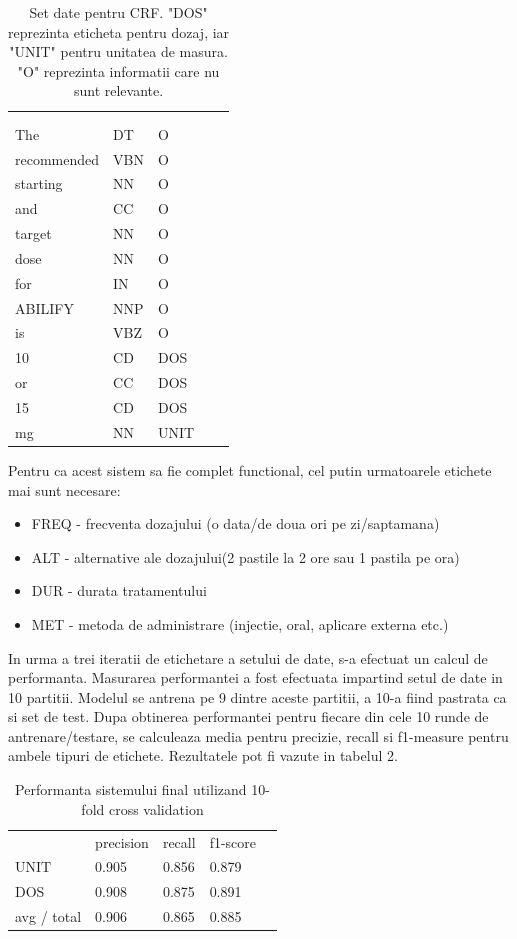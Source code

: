 \documentclass[a4paper,12pt]{article}
\begin{document}
\begin{table}[h]
\centering

\begin{tabular}{lllll}
            &     &     &  &  \\
            &     &     &  &  \\
The         & DT  & O   &  &  \\
recommended & VBN & O   &  &  \\
starting    & NN  & O   &  &  \\
and         & CC  & O   &  &  \\
target      & NN  & O   &  &  \\
dose        & NN  & O   &  &  \\
for         & IN  & O   &  &  \\
ABILIFY     & NNP & O   &  &  \\
is          & VBZ & O   &  &  \\
10          & CD  & DOS &  &  \\
or          & CC  & DOS &  &  \\
15          & CD  & DOS &  &  \\
mg          & NN  & UNIT &  & 
\end{tabular}
\caption{Set date pentru CRF. "DOS" reprezinta eticheta pentru dozaj, iar "UNIT" pentru unitatea de masura. "O" reprezinta informatii care nu sunt relevante.}
\end{table}

Pentru ca acest sistem sa fie complet functional, cel putin urmatoarele etichete mai sunt necesare: 
\begin{itemize}
\item FREQ - frecventa dozajului (o data/de doua ori pe zi/saptamana)
\item ALT - alternative ale dozajului(2 pastile la 2 ore sau 1 pastila pe ora)
\item DUR - durata tratamentului
\item MET - metoda de administrare (injectie, oral, aplicare externa etc.)
\end{itemize}
In urma a trei iteratii de etichetare a setului de date, s-a efectuat un calcul de performanta.
 Masurarea performantei a fost efectuata impartind setul de date in 10 partitii. Modelul se antrena pe 9 dintre aceste partitii, a 10-a fiind pastrata ca si set de test. Dupa obtinerea performantei pentru fiecare din cele 10 runde de antrenare/testare, se calculeaza media pentru precizie, recall si f1-measure pentru ambele tipuri de etichete. Rezultatele pot fi vazute in tabelul 2.
 \begin{table}[h]
\centering

\label{my-label}
\begin{tabular}{lllll}
            & precision & recall & f1-score &  \\
UNIT        & 0.905     & 0.856  & 0.879    &  \\
DOS         & 0.908     & 0.875  & 0.891    &  \\
avg / total & 0.906     & 0.865  & 0.885    & 
\end{tabular}
\caption{Performanta sistemului final utilizand 10-fold cross validation}
\end{table}
 
\end{document}
